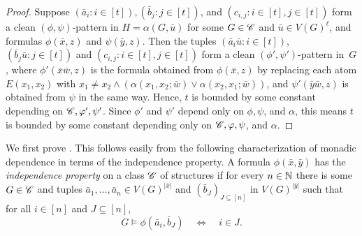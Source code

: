 \obsdpinterp*
\begin{proof}
    Suppose $(\bar a_i:i\in [t]),(\bar b_j:j\in [t])$, and $(c_{i,j}:i\in [t],j\in [t])$ form a clean $(\phi,\psi)$-pattern in $H=\alpha(G,\bar u)$ for some $G\in\mathscr C$ and $\bar u\in V(G)^\ell$, and formulas $\phi(\bar x,z)$ and $\psi(\bar y,z)$.
    Then the tuples $(\bar a_i\bar u:i\in [t])$, $(\bar b_j\bar u:j\in [t])$ and $(c_{i,j}:i\in [t],j\in[t])$ form a clean $(\phi',\psi')$-pattern in~$G$,
    where $\phi'(\bar x\bar w,z)$ is the formula obtained from $\phi(\bar x,z)$ by replacing each atom $E(x_1,x_2)$ with $x_1\neq x_2\land(\alpha(x_1,x_2;\bar w)\lor\alpha(x_2,x_1;\bar w))$, and $\psi'(\bar y\bar w,z)$ is obtained from $\psi$ in the same way. Hence, $t$ is bounded by some constant depending on $\mathscr C,\varphi',\psi'$. Since $\phi'$ and $\psi'$ depend only on $\phi,\psi$, and $\alpha$,
    this means $t$ is bounded by some constant depending only on $\mathscr C,\varphi,\psi$, and $\alpha$.
\end{proof}

We first prove . This follows easily 
from the following characterization of monadic dependence in terms of the independence property.
A formula $\phi(\bar x,\bar y)$ has the \emph{independence property} on a class $\mathscr C$ of structures if for every $n\in\mathbb N$ there is some $G\in \mathscr C$ and tuples $\bar a_1,\ldots,\bar a_n\in V(G)^{|\bar x|}$ and $(\bar b_J)_{J\subseteq[n]}$ in $V(G)^{|\bar y|}$ such that for all $i\in[n]$ and $J\subseteq[n]$,
\[
    G\models\phi(\bar a_i,\bar b_J)
    \quad\Longleftrightarrow\quad
    i\in J.
\]

